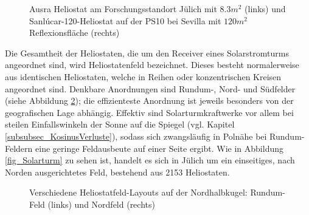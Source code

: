 \begin{figure}[h!]
    \centering
    \setlength{\fboxsep}{1pt}
    \setlength{\fboxrule}{1pt}
\caption[Ausra Heliostat am Forschungsstandort Jülich mit $8.3m^2$  und Sanlúcar-120-Heliostat auf der PS10 bei Sevilla mit $120m^2$ Reflexionsfläche]{Ausra Heliostat am Forschungsstandort Jülich mit $8.3m^2$  (links) und Sanlúcar-120-Heliostat auf der PS10 bei Sevilla mit $120m^2$ Reflexionsfläche (rechts) \cite[S.13]{DissBelhomme}}
    \label{fig_DarstellungHeliostat}
\end{figure}

Die Gesamtheit der Heliostaten, die um den Receiver eines Solarstromturms angeordnet sind, wird Heliostatenfeld bezeichnet.
Dieses besteht normalerweise aus identischen Heliostaten, welche in Reihen oder konzentrischen Kreisen angeordnet sind.
Denkbare Anordnungen sind Rundum-, Nord- und Südfelder (siehe Abbildung \ref{fig_AnordnungHeliostatfeld}); die effizienteste Anordnung ist jeweils besonders von der geografischen Lage abhängig.
Effektiv sind Solarturmkraftwerke vor allem bei steilen Einfallswinkeln der Sonne auf die Spiegel (vgl. Kapitel \ref{subsubsec_KosinusVerluste}), sodass sich zwangsläufig in Polnähe bei Rundum-Feldern eine geringe Feldausbeute auf einer Seite ergibt.
Wie in Abbildung \ref{fig_Solarturm} zu sehen ist, handelt es sich in Jülich um ein einseitiges, nach Norden ausgerichtetes Feld, bestehend aus 2153 Heliostaten.

\begin{figure}[h!]
    \centering
    \setlength{\fboxsep}{1pt}
    \setlength{\fboxrule}{1pt}
\caption[Verschiedene Heliostatfeld-Layouts auf der Nordhalbkugel: Rundum-Feld und Nordfeld]{Verschiedene Heliostatfeld-Layouts auf der Nordhalbkugel: Rundum-Feld (links) und Nordfeld (rechts) \cite[S.14]{DissBelhomme}}
    \label{fig_AnordnungHeliostatfeld}
\end{figure}

